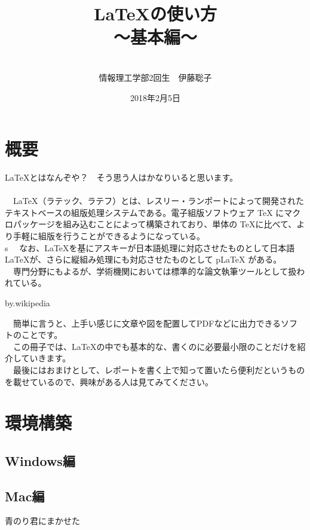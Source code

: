 \documentclass[a4j]{jarticle}
\begin{document}
%
%
\begin{titlepage}
\title{\LaTeX の使い方 \\
～基本編～}
\author{
\\
情報理工学部2回生　伊藤聡子　
\\
}
\date{2018年2月5日}
\maketitle
\thispagestyle{empty}
\newpage
\end{titlepage}

%
%
\tableofcontents
\newpage

%
%
\section{概要}
\LaTeX とはなんぞや？　そう思う人はかなりいると思います。\\
\\
　\LaTeX （ラテック、ラテフ）とは、レスリー・ランポートによって開発されたテキストベースの組版処理システムである。電子組版ソフトウェア TeX にマクロパッケージを組み込むことによって構築されており、単体の \TeX に比べて、より手軽に組版を行うことができるようになっている。\\s
　なお、\LaTeX を基にアスキーが日本語処理に対応させたものとして日本語 \LaTeX が、さらに縦組み処理にも対応させたものとして pLaTeX がある。\\
　専門分野にもよるが、学術機関においては標準的な論文執筆ツールとして扱われている。
\begin{flushright}
 by.wikipedia
\end{flushright}
　簡単に言うと、上手い感じに文章や図を配置してPDFなどに出力できるソフトのことです。\\
　この冊子では、\LaTeX の中でも基本的な、書くのに必要最小限のことだけを紹介していきます。\\
　最後にはおまけとして、レポートを書く上で知って置いたら便利だというものを載せているので、興味がある人は見てみてください。
\newpage

%
%
\section{環境構築}
\subsection{Windows編}
\subsection{Mac編}
青のり君にまかせた
\end{document}
